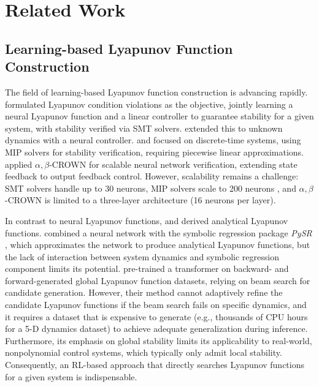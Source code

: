 \section{Related Work}
\subsection{Learning-based Lyapunov Function Construction}

The field of learning-based Lyapunov function construction is advancing rapidly. \citet{chang2019neural} formulated Lyapunov condition violations as the objective, jointly learning a neural Lyapunov function and a linear controller to guarantee stability for a given system, with stability verified via SMT solvers. \citet{zhou2022neural} extended this to unknown dynamics with a neural controller. \citet{dailyapunov} and \citet{wu2023neural} focused on discrete-time systems, using MIP solvers for stability verification, requiring piecewise linear approximations. \citet{yang2024lyapunovstable} applied $\alpha,\beta$-CROWN for scalable neural network verification, extending state feedback to output feedback control. However, scalability remains a challenge: SMT solvers handle up to 30 neurons, MIP solvers scale to 200 neurons \citet{DawsonSurvey}, and $\alpha,\beta$-CROWN \citet{yang2024lyapunovstable} is limited to a three-layer architecture (16 neurons per layer).


In contrast to neural Lyapunov functions, \citet{feng2024} and \citet{alfarano2024global} derived analytical Lyapunov functions. \citet{feng2024} combined a neural network with the symbolic regression package \textit{PySR} \citep{pysr}, which approximates the network to produce analytical Lyapunov functions, but the lack of interaction between system dynamics and symbolic regression component limits its potential. \citet{alfarano2024global} pre-trained a transformer on backward- and forward-generated global Lyapunov function datasets, relying on beam search for candidate generation. However, their method cannot adaptively refine the candidate Lyapunov functions if the beam search fails on specific dynamics, and it requires a dataset that is expensive to generate (e.g., thousands of CPU hours for a 5-D dynamics dataset) to achieve adequate generalization during inference. Furthermore, its emphasis on global stability limits its applicability to real-world, nonpolynomial control systems, which typically only admit local stability. Consequently, an RL-based approach that directly searches Lyapunov functions for a given system is indispensable.


